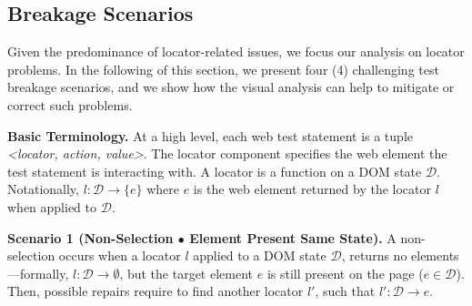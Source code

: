 \subsection{Breakage Scenarios}\label{sec:breakage-scenarios}

Given the predominance of locator-related issues, we focus our analysis on locator problems. In the following of this section, we present four (4) challenging test breakage scenarios, and we show how the visual analysis can help to mitigate or correct such problems. 

\noindent
\textbf{Basic Terminology.}
At a high level, each web test statement is a tuple \textit{<locator, action, value>}. 
The locator component specifies the web element the test statement is interacting with. A locator is a function on a DOM state $\mathcal{D}$. Notationally, $l: \mathcal{D} \rightarrow \{e\}$ where $e$ is the web element returned by the locator $l$ when applied to $\mathcal{D}$. 
%

\noindent
\textbf{Scenario 1 (Non-Selection $\bullet$ Element Present Same State).}
A non-selection occurs when a locator $l$ applied to a DOM state $\mathcal{D}$, returns no elements---formally, $l: \mathcal{D} \rightarrow \emptyset$, but the target element $e$ is still present on the page ($e \in \mathcal{D}$).
Then, possible repairs require to find another locator $l'$, such that $l': \mathcal{D} \rightarrow e$.

